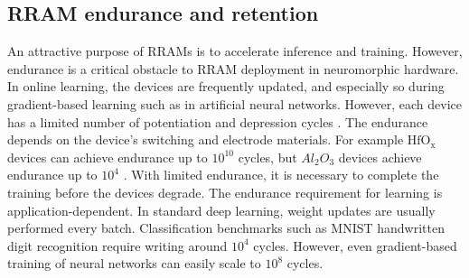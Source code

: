 \documentclass[english]{article}
\renewcommand{\cite}{\citep}
\begin{document}
\subsection{RRAM endurance and retention}
An attractive purpose of RRAMs is to accelerate inference and training.
However, endurance is a critical obstacle to RRAM deployment in neuromorphic hardware. 
In online learning, the devices are frequently updated, and especially so during gradient-based learning such as in artificial neural networks.
However, each device has a limited number of potentiation and depression cycles \cite{zhao2018characterizing,chen2011physical}. 
The endurance depends on the device's switching and electrode materials. For example $\mathrm{HfO_x}$ devices can achieve endurance up to $10^{10}$ cycles, but $Al_2O_3$ devices achieve endurance up to $10^4$ \cite{nail2016understanding}.  
With limited endurance, it is necessary to complete the training before the devices degrade.
The endurance requirement for learning is application-dependent. 
In standard deep learning, weight updates are usually performed every batch. 
Classification benchmarks such as MNIST handwritten digit recognition require writing around $10^4$ cycles.
However, even gradient-based training of neural networks can easily scale to $10^8$ cycles. 
 
\end{document}
